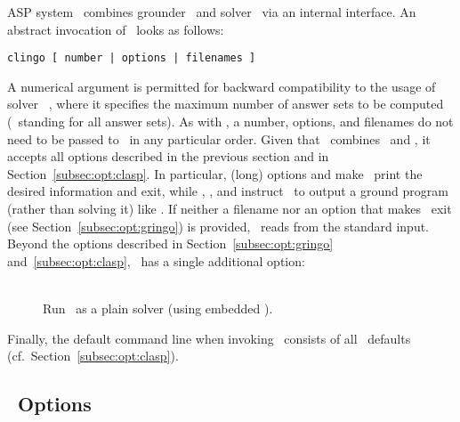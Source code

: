 ASP system \clingo\ combines grounder \gringo\ and solver \clasp\
via an internal interface.
An abstract invocation of \clingo\ looks as follows:
%
\begin{lstlisting}[numbers=none]
clingo [ number | options | filenames ]
\end{lstlisting}
%
A numerical argument is permitted for backward compatibility to
the usage of solver \smodels~\cite{siniso02a},
where it specifies the maximum number of answer sets to be computed
(\code{0}~standing for all answer sets).
As with \gringo, a number, options, and filenames do not need to be passed to \clingo\
in any particular order.
Given that \clingo\ combines \gringo\ and \clasp,
it accepts all options described in the previous section
and in Section~\ref{subsec:opt:clasp}.
In particular, (long) options \code{--help} and 
make \clingo\ print the desired information and exit,
while \code{--text}, \code{--lparse}, and \code{--reify}
instruct \clingo\ to output a ground program (rather than solving it) like \gringo.
If neither a filename nor an option that makes \clingo\ exit
(see Section~\ref{subsec:opt:gringo}) is provided, \clingo\ reads from the standard input.
Beyond the options described in Section~\ref{subsec:opt:gringo} and~\ref{subsec:opt:clasp},
\clingo\ has a single additional option:
%
\begin{description}
\item[]~\\
Run \clingo\ as a plain solver (using embedded \clasp).
\end{description}
%
Finally, the default command line when invoking \clingo\
consists of all \clasp\ defaults (cf.\ Section~\ref{subsec:opt:clasp}).


\subsection{\iclingo\ Options}\label{subsec:opt:iclingo}

